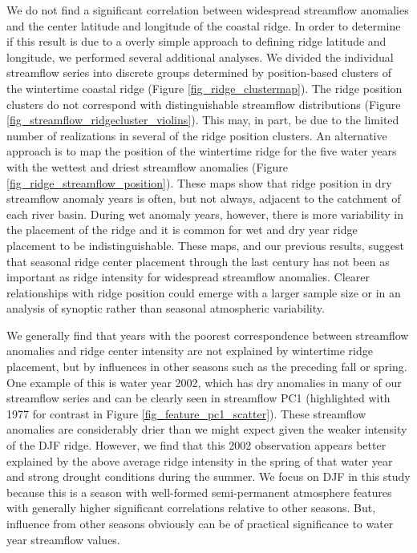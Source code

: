 \documentclass[final, double]{ua-thesis}
\begin{document}
We do not find a significant correlation between widespread streamflow anomalies and the center latitude and longitude of the coastal ridge.  In order to determine if this result is due to a overly simple approach to defining ridge latitude and longitude, we performed several additional analyses.  We divided the individual streamflow series into discrete groups determined by position-based clusters of the wintertime coastal ridge (Figure \ref{fig_ridge_clustermap}). The ridge position clusters do not correspond with distinguishable streamflow distributions (Figure \ref{fig_streamflow_ridgecluster_violins}). This may, in part, be due to the limited number of realizations in several of the ridge position clusters. An alternative approach is to map the position of the wintertime ridge for the five water years with the wettest and driest streamflow anomalies (Figure \ref{fig_ridge_streamflow_position}). These maps show that ridge position in dry streamflow anomaly years is often, but not always, adjacent to the catchment of each river basin. During wet anomaly years, however, there is more variability in the placement of the ridge and it is common for wet and dry year ridge placement to be indistinguishable. These maps, and our previous results, suggest that seasonal ridge center placement through the last century has not been as important as ridge intensity for widespread streamflow anomalies. Clearer relationships with ridge position could emerge with a larger sample size or in an analysis of synoptic rather than seasonal atmospheric variability.

We generally find that years with the poorest correspondence between streamflow anomalies and ridge center intensity are not explained by wintertime ridge placement, but by influences in other seasons such as the preceding fall or spring. One example of this is water year 2002, which has dry anomalies in many of our streamflow series and can be clearly seen in streamflow PC1 (highlighted with 1977 for contrast in Figure \ref{fig_feature_pc1_scatter}). These streamflow anomalies are  considerably drier than we might expect given the weaker intensity of the DJF ridge. However, we find that this 2002 observation appears better explained by the above average ridge intensity in the spring of that water year and strong drought conditions during the summer. We focus on DJF in this study because this is a season with well-formed semi-permanent atmosphere features with generally higher significant correlations relative to other seasons. But, influence from other seasons obviously can be of practical significance to water year streamflow values.
\end{document}
